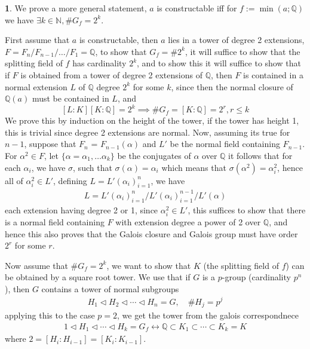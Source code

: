 \documentclass[11pt]{article}
\theoremstyle{definition}
\newtheorem{pb}{}
\newcommand{\set}[1]{\{#1\}}
\begin{document}
    \begin{pb}
        We prove a more general statement, \(a\) is constructable iff for \(f := \min(a;\mathbb{Q})\)
        we have \(\exists k \in \mathbb{N}, \# G_f = 2^k\).

        First assume that \(a\) is constructable, then \(a\) lies in a tower of degree 2 extensions, \(F = F_n/F_{n-1}/\hdots/F_1 = \mathbb{Q}\), to show that \(G_f = \#2^k\), it will suffice to show that the splitting field of \(f\) has cardinality \(2^k\), and to show this it will suffice to show that if \(F\) is obtained from a tower of degree 2 extensions of \(\mathbb{Q}\), then \(F\) is contained in a normal extension \(L\) of \(\mathbb{Q}\) degree \(2^k\) for some \(k\), since then the normal closure of \(\mathbb{Q}(a)\) must be contained in \(L\), and
        \[[L:K][K:\mathbb{Q}] = 2^k \implies \#G_f = [K:\mathbb{Q}] = 2^r, r \leq k\]
        We prove this by induction on the height of the tower, if the tower has height 1, this is trivial since degree 2 extensions are normal. Now, assuming its true for \(n-1\), suppose that \(F_n\) = \(F_{n-1}(\alpha)\) and \(L'\) be the normal field containing \(F_{n-1}\). For \(\alpha^2 \in F\), let \(\set{\alpha = \alpha_1, \hdots \alpha_k}\) be the conjugates of \(\alpha\) over \(\mathbb{Q}\) it follows that for each \(\alpha_i\), we have \(\sigma\), such that \(\sigma(\alpha) = \alpha_i\) which means that \(\sigma(\alpha^2) = \alpha_i^2\), hence all of \(\alpha_i^2 \in L'\), defining \(L = L'(\alpha_i)_{i=1}^n\), we have
        \begin{align*}
            L = L'(\alpha_i)_{i=1}^n/L'(\alpha_i)_{i=1}^{n-1}/L'(\alpha)
        \end{align*}
        each extension having degree 2 or 1, since \(\alpha_i^2 \in L'\), this suffices to show that there is a normal field containing \(F\) with extension degree a power of 2 over \(\mathbb{Q}\), and hence this also proves that the Galois closure and Galois group must have order \(2^r\) for some \(r\). 
        
        Now assume that \(\# G_f = 2^k\), we want to show that \(K\) (the splitting field of \(f\)) can be obtained by a square root tower. We use that if \(G\) is a \(p\)-group (cardinality \(p^n\)), then \(G\) contains a tower of normal subgroups
        \begin{align*}
            H_1 \lhd H_2 \lhd \cdots \lhd H_n = G, \quad \# H_j = p^j
        \end{align*}
        applying this to the case \(p=2\), we get the tower from the galois correspondnece
        \begin{align*}
            1 \lhd H_1 \lhd \cdots \lhd H_k = G_f \longleftrightarrow \mathbb{Q} \subset K_1 \subset \cdots \subset K_k = K 
        \end{align*}
        where \(2 = [H_i:H_{i-1}] = [K_i:K_{i-1}]\).


\end{pb}
\end{document}
